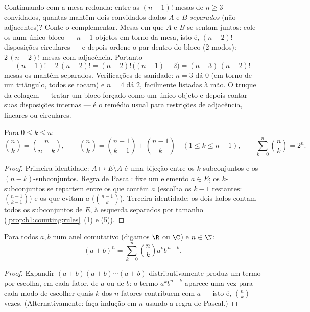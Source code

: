 \begin{example}\label{ex:b1:counting:constraint}
Continuando com a mesa redonda: entre as $(n-1)!$ mesas de $n \geq
3$
convidados, quantas mantêm dois convidados dados $A$ e $B$
\emph{separados} (não adjacentes)? Conte o complementar. Mesas em que
$A$ e $B$ se sentam juntos: cole-os num único bloco --- $n - 1$ objetos
em torno da mesa, isto é, $(n-2)!$ disposições circulares --- e depois
ordene o par dentro do bloco ($2$ modos): $2\,(n-2)!$ mesas com
adjacência. Portanto
\[
(n-1)! - 2\,(n-2)! = (n-2)!\,\bigl((n - 1) - 2\bigr)
= (n-3)\,(n-2)!
\]
mesas os mantêm separados. Verificações de sanidade: $n = 3$ dá $0$ (em
torno de um triângulo, todos se tocam) e $n = 4$ dá $2$, facilmente
listadas à mão. O truque da colagem --- tratar um bloco forçado como um
único objeto e depois contar suas disposições internas --- é o remédio
usual para restrições de adjacência, lineares ou circulares.
\end{example}

\begin{proposition}\label{prop:b1:counting:identities}
Para $0 \leq k \leq n$:
\[
\binom{n}{k} = \binom{n}{n-k},
\qquad
\binom{n}{k} = \binom{n-1}{k-1} + \binom{n-1}{k}
\quad (1 \leq k \leq n-1),
\qquad
\sum_{k=0}^{n} \binom{n}{k} = 2^n .
\]
\end{proposition}

\begin{proof}
Primeira identidade: $A \mapsto E \setminus A$ é uma bijeção entre
os $k$-subconjuntos e os $(n-k)$-subconjuntos. Regra de
Pascal: fixe um elemento $a \in E$; os
$k$-subconjuntos se repartem entre os que contêm $a$ (escolha os $k - 1$
restantes: $\binom{n-1}{k-1}$) e os que evitam $a$ ($\binom{n-1}{k}$). Terceira
identidade: os dois lados contam todos os subconjuntos de $E$, à
esquerda separados por tamanho
(\cref{prop:b1:counting:rules}~(1) e (5)).
\end{proof}

\begin{theorem}\label{thm:b1:counting:binomial}
Para todos $a, b$ num anel comutativo (digamos $\R$ ou $\C$) e $n \in \N$:
\[
(a + b)^n = \sum_{k=0}^{n} \binom{n}{k} a^k b^{\,n-k} .
\]
\end{theorem}

\begin{proof}
Expandir $(a+b)(a+b)\cdots(a+b)$ distributivamente produz um termo por
escolha, em cada fator, de $a$ ou de $b$: o termo $a^k b^{n-k}$
aparece uma vez para cada modo de escolher quais $k$ dos $n$ fatores
contribuem com $a$ --- isto é, $\binom nk$ vezes. (Alternativamente: faça
indução em $n$ usando a regra de Pascal.)
\end{proof}

